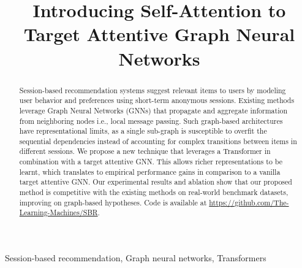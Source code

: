 \documentclass[conference]{IEEEtran}
\begin{document}
\title{Introducing Self-Attention to Target Attentive Graph Neural Networks
}

\author{
\and
{}
\and
{}
\and
{}
}

\maketitle

\begin{abstract}
Session-based recommendation systems suggest relevant items to users by modeling user behavior and preferences using short-term anonymous sessions. Existing methods leverage Graph Neural Networks (GNNs) that propagate and aggregate information from neighboring nodes i.e., local message passing. Such graph-based architectures have representational limits, as a single sub-graph is susceptible to overfit the sequential dependencies instead of accounting for complex transitions between items in different sessions. We propose a new technique that leverages a Transformer in combination with a target attentive GNN. This allows richer representations to be learnt, which translates to empirical performance gains in comparison to a vanilla target attentive GNN. Our experimental results and ablation show that our proposed method is competitive with the existing methods on real-world benchmark datasets, improving on graph-based hypotheses. Code is available at \url{https://github.com/The-Learning-Machines/SBR}.
\end{abstract}

\begin{IEEEkeywords}
Session-based recommendation, Graph neural networks, Transformers
\end{IEEEkeywords}
\end{document}
